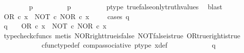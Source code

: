 \begin{isabellebody}
\ \ \isamarkupfalse%
\isanewline
\ \ \ \ \isamarkupfalse%
\ {\isachardoublequoteopen}p\ {\isasymnoteq}\ {\isasymt}{\isachardoublequoteclose}\isanewline
\ \ \ \ \isamarkupfalse%
\ \isamarkupfalse%
\ {\isachardoublequoteopen}p\ {\isacharequal}{\kern0pt}\ {\isasymf}{\isachardoublequoteclose}\isanewline
\ \ \ \ \ \ \isamarkupfalse%
\ p{\isacharunderscore}{\kern0pt}type\ true{\isacharunderscore}{\kern0pt}false{\isacharunderscore}{\kern0pt}only{\isacharunderscore}{\kern0pt}truth{\isacharunderscore}{\kern0pt}values\ \isamarkupfalse%
\ blast\isanewline
\ \ \ \ \isamarkupfalse%
\ {\isachardoublequoteopen}OR\ {\isasymcirc}\isactrlsub c\ x\ {\isacharequal}{\kern0pt}\ {\isacharparenleft}{\kern0pt}NOT\ {\isasymcirc}\isactrlsub c\ NOR{\isacharparenright}{\kern0pt}\ {\isasymcirc}\isactrlsub c\ x{\isachardoublequoteclose}\isanewline
\ \ \ \ \isamarkupfalse%
{\isacharparenleft}{\kern0pt}cases\ {\isachardoublequoteopen}q\ {\isacharequal}{\kern0pt}\ {\isasymt}{\isachardoublequoteclose}{\isacharparenright}{\kern0pt}\isanewline
\ \ \ \ \ \ \isamarkupfalse%
\ {\isachardoublequoteopen}q\ {\isacharequal}{\kern0pt}\ {\isasymt}\ {\isasymLongrightarrow}\ OR\ {\isasymcirc}\isactrlsub c\ x\ {\isacharequal}{\kern0pt}\ {\isacharparenleft}{\kern0pt}NOT\ {\isasymcirc}\isactrlsub c\ NOR{\isacharparenright}{\kern0pt}\ {\isasymcirc}\isactrlsub c\ x{\isachardoublequoteclose}\isanewline
\ \ \ \ \ \ \ \ \isamarkupfalse%
\ {\isacharparenleft}{\kern0pt}typecheck{\isacharunderscore}{\kern0pt}cfuncs{\isacharcomma}{\kern0pt}\ metis\ NOR{\isacharunderscore}{\kern0pt}right{\isacharunderscore}{\kern0pt}true{\isacharunderscore}{\kern0pt}is{\isacharunderscore}{\kern0pt}false\ NOT{\isacharunderscore}{\kern0pt}false{\isacharunderscore}{\kern0pt}is{\isacharunderscore}{\kern0pt}true\ OR{\isacharunderscore}{\kern0pt}true{\isacharunderscore}{\kern0pt}right{\isacharunderscore}{\kern0pt}is{\isacharunderscore}{\kern0pt}true\ \isanewline
\ \ \ \ \ \ \ \ \ \ \ \ cfunc{\isacharunderscore}{\kern0pt}type{\isacharunderscore}{\kern0pt}def\ comp{\isacharunderscore}{\kern0pt}associative\ p{\isacharunderscore}{\kern0pt}type\ x{\isacharunderscore}{\kern0pt}def{\isacharparenright}{\kern0pt}\isanewline
\ \ \ \ \isamarkupfalse%
\isanewline
\ \ \ \ \ \ \isamarkupfalse%
\ {\isachardoublequoteopen}q\ {\isasymnoteq}\ {\isasymt}{\isachardoublequoteclose}\isanewline
\ \ \ \ \ \ \isamarkupfalse%
\ \isamarkupfalse%

\end{isabellebody}
